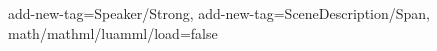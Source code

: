 

\tagpdfsetup
 {
  add-new-tag=Speaker/Strong,
  add-new-tag=SceneDescription/Span,
  math/mathml/luamml/load=false
 }

\renewcommand\DocumentMetadata[1]{}
\renewcommand\tagpdfsetup[1]{}


